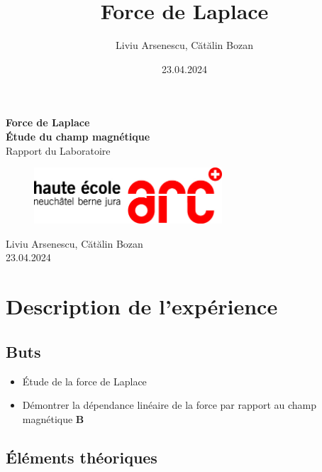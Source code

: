 \documentclass[12pt,a4paper]{article}
\title{Force de Laplace}
\author{Liviu Arsenescu, Cătălin Bozan}
\date{23.04.2024}
\begin{document}
    \begin{titlepage}
        \begin{center}
            \vspace*{\fill}
            \Huge \textbf{Force de Laplace} \\
            \Huge \textbf{Étude du champ magnétique} \\
            \Large Rapport du Laboratoire \\
            \begin{figure}[h]
                \centering
                \includegraphics[width=7cm]{hearclogo.png}
            \end{figure}
            \vspace{\fill}
            \Large Liviu Arsenescu, Cătălin Bozan \\
            23.04.2024

            \vspace*{\fill}
        \end{center}
    \end{titlepage}

    \thispagestyle{empty}
    \tableofcontents
    \newpage

    \section{Description de l'expérience}
    \subsection{Buts}
    \begin{itemize}
        \item Étude de la force de Laplace
        \item Démontrer la dépendance linéaire de la force par rapport au champ magnétique $\bm{B}$
    \end{itemize}

    \subsection{Éléments théoriques}
\end{document}
